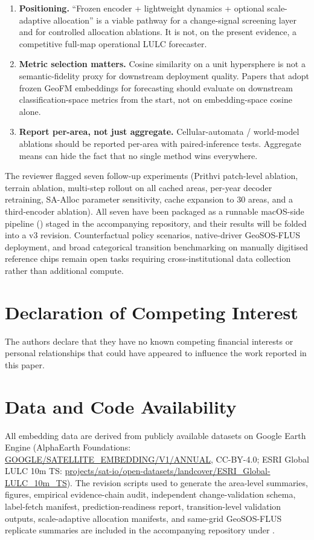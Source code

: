 \documentclass{article}
\begin{document}
\begin{enumerate}
\item \textbf{Positioning.} ``Frozen encoder + lightweight dynamics + optional scale-adaptive allocation'' is a viable pathway for a change-signal screening layer and for controlled allocation ablations. It is not, on the present evidence, a competitive full-map operational LULC forecaster.
\item \textbf{Metric selection matters.} Cosine similarity on a unit hypersphere is not a semantic-fidelity proxy for downstream deployment quality. Papers that adopt frozen GeoFM embeddings for forecasting should evaluate on downstream classification-space metrics from the start, not on embedding-space cosine alone.
\item \textbf{Report per-area, not just aggregate.} Cellular-automata / world-model ablations should be reported per-area with paired-inference tests. Aggregate means can hide the fact that no single method wins everywhere.
\end{enumerate}

The reviewer flagged seven follow-up experiments (Prithvi patch-level ablation, terrain ablation, multi-step rollout on all cached areas, per-year decoder retraining, SA-Alloc parameter sensitivity, cache expansion to 30 areas, and a third-encoder ablation). All seven have been packaged as a runnable macOS-side pipeline () staged in the accompanying repository, and their results will be folded into a v3 revision. Counterfactual policy scenarios, native-driver GeoSOS-FLUS deployment, and broad categorical transition benchmarking on manually digitised reference chips remain open tasks requiring cross-institutional data collection rather than additional compute.


\section*{Declaration of Competing Interest}
The authors declare that they have no known competing financial interests or personal relationships that could have appeared to influence the work reported in this paper.

\section*{Data and Code Availability}
All embedding data are derived from publicly available datasets on Google Earth Engine (AlphaEarth Foundations: \url{GOOGLE/SATELLITE_EMBEDDING/V1/ANNUAL}, CC-BY-4.0; ESRI Global LULC 10m TS: \url{projects/sat-io/open-datasets/landcover/ESRI_Global-LULC_10m_TS}). The revision scripts used to generate the area-level summaries, figures, empirical evidence-chain audit, independent change-validation schema, label-fetch manifest, prediction-readiness report, transition-level validation outputs, scale-adaptive allocation manifests, and same-grid GeoSOS-FLUS replicate summaries are included in the accompanying repository under .
\end{document}
